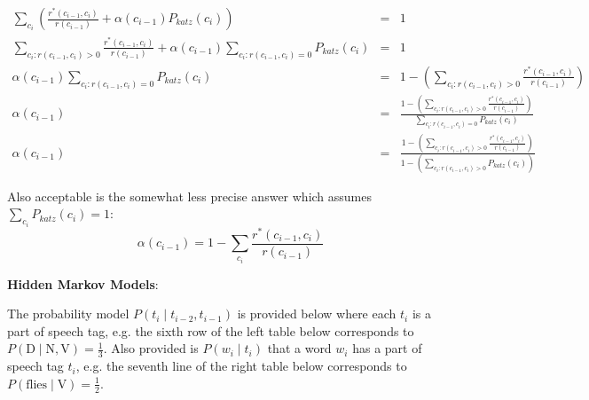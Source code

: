 \documentclass[11pt]{article}
\begin{document}
\begin{exe}
\begin{soln}
\begin{eqnarray*}
\sum_{c_i} \left( \frac{r^\ast(c_{i-1}, c_i)}{r(c_{i-1})} + \alpha(c_{i-1}) P_\textit{katz}(c_i) \right) &=& 1 \\
\sum_{c_i : r(c_{i-1}, c_i) > 0} \frac{r^\ast(c_{i-1}, c_i)}{r(c_{i-1})} + \alpha(c_{i-1}) \sum_{c_i : r(c_{i-1}, c_i) = 0} P_\textit{katz}(c_i) &=& 1 \\
\alpha(c_{i-1}) \sum_{c_i : r(c_{i-1}, c_i) = 0} P_\textit{katz}(c_i) &=& 1 - \left( \sum_{c_i : r(c_{i-1}, c_i) > 0} \frac{r^\ast(c_{i-1}, c_i)}{r(c_{i-1})}  \right) \\
\alpha(c_{i-1}) &=& \frac{1 - \left( \sum_{c_i : r(c_{i-1}, c_i) > 0} \frac{r^\ast(c_{i-1}, c_i)}{r(c_{i-1})}  \right)}{\sum_{c_i : r(c_{i-1}, c_i) = 0} P_\textit{katz}(c_i)} \\
\alpha(c_{i-1}) &=& \frac{1 - \left( \sum_{c_i : r(c_{i-1}, c_i) > 0} \frac{r^\ast(c_{i-1}, c_i)}{r(c_{i-1})}  \right)}{1 - \left( \sum_{c_i : r(c_{i-1}, c_i) > 0} P_\textit{katz}(c_i) \right) } 
\end{eqnarray*}

Also acceptable is the somewhat less precise answer which assumes $\sum_{c_i} P_\textit{katz}(c_i) = 1$:
\[ \alpha(c_{i-1}) = 1 - \sum_{c_i} \frac{ r^\ast(c_{i-1}, c_i) }{ r(c_{i-1}) } \]

\end{soln}

\bigskip
\ex\label{hmm} \textbf{Hidden Markov Models}:

The probability model $P(t_i \mid t_{i-2}, t_{i-1})$ 
is provided below 
where each $t_i$ is a part of speech tag, e.g. the sixth row of
the left table below corresponds to
$P(\textrm{D} \mid \textrm{N}, \textrm{V}) = \frac{1}{3}$. 
Also provided is $P(w_i \mid t_i)$ that a word $w_i$ has a part of speech 
tag $t_i$, e.g. the seventh line of the right table below corresponds to $P(\textrm{flies} \mid \textrm{V}) = \frac{1}{2}$. 


\end{exe}
\end{document}
